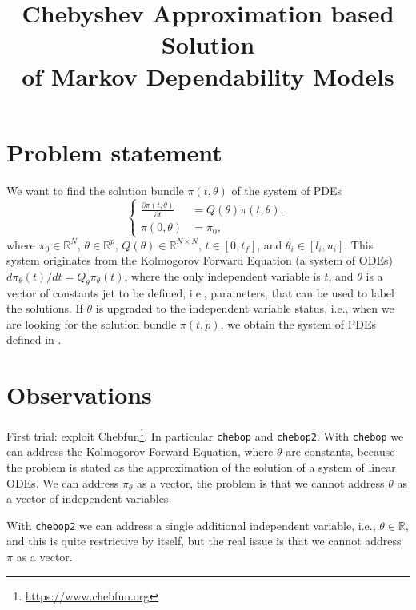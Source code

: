 \documentclass[]{article}
\title{Chebyshev Approximation based Solution\\of Markov Dependability Models}
\author{}
\begin{document}
\maketitle

\begin{abstract}

\end{abstract}

\section{Problem statement}
We want to find the solution bundle $\pi(t,\theta)$ of the system of PDEs
\begin{equation}
\label{eq:PDEs}
\begin{cases}
\frac{\partial\pi(t,\theta)}{\partial t} &= Q(\theta)\pi(t,\theta),\\
\pi(0,\theta) &= \pi_0,
\end{cases}
\end{equation}
where $\pi_0\in\mathbb R^N$, $\theta\in\mathbb R^p$, 
$Q(\theta)\in\mathbb R^{N\times N}$, $t\in[0,t_f]$, and 
$\theta_i\in [l_i,u_i]$.
This system originates from the Kolmogorov Forward Equation (a system of ODEs)
$d\pi_{\theta}(t)/dt = Q_{\theta}\pi_{\theta}(t)$,
where the only independent variable is $t$, and $\theta$ is a vector of constants 
jet to be defined, i.e., parameters, that can be used to label the solutions.
If $\theta$ is upgraded to the independent variable status, i.e., when we 
are looking for the solution bundle $\pi(t,p)$, 
we obtain the system of PDEs defined in .

\section{Observations}
First trial: exploit Chebfun\footnote{\url{https://www.chebfun.org}}.
In particular \texttt{chebop} and \texttt{chebop2}.
With \texttt{chebop} we can address the Kolmogorov Forward Equation, where $\theta$ 
are constants, because the problem is stated as the approximation of the 
solution of a system of linear ODEs.
We can address $\pi_{\theta}$ as a vector, the problem is that we cannot 
address $\theta$ as a vector of independent variables.

With \texttt{chebop2} we can address a single additional independent variable, 
i.e., $\theta\in\mathbb R$, and this is quite restrictive by itself,
but the real issue is that we cannot address $\pi$ as a vector.
\end{document}

